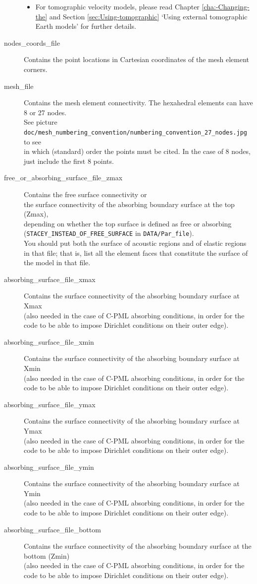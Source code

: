 \begin{description}
\begin{itemize}
\item For tomographic velocity models, please read Chapter \ref{cha:-Changing-the}
and Section \ref{sec:Using-tomographic} `Using external tomographic
Earth models' for further details.
\end{itemize}
\item [{nodes\_coords\_file}] Contains the point locations in Cartesian
coordinates of the mesh element corners.
\item [{mesh\_file}] Contains the mesh element connectivity. The hexahedral
elements can have 8 or 27 nodes.\\
 See picture \texttt{doc/mesh\_numbering\_convention/numbering\_convention\_27\_nodes.jpg}
to see\\
 in which (standard) order the points must be cited. In the case of
8 nodes, just include the first 8 points.
\item [{free\_or\_absorbing\_surface\_file\_zmax}] Contains the free surface
connectivity or \\
 the surface connectivity of the absorbing boundary surface at the
top (Zmax), \\
 depending on whether the top surface is defined as free or absorbing
(\texttt{STACEY\_INSTEAD\_OF\_FREE\_SURFACE} in \texttt{DATA/Par\_file}). \\
 You should put both the surface of acoustic regions and of elastic
regions in that file; that is, list all the element faces that constitute
the surface of the model in that file.
\item [{absorbing\_surface\_file\_xmax}] Contains the surface connectivity
of the absorbing boundary surface at Xmax \\
(also needed in the case of C-PML absorbing conditions, in order for
the code to be able to impose Dirichlet conditions on their outer
edge).
\item [{absorbing\_surface\_file\_xmin}] Contains the surface connectivity
of the absorbing boundary surface at Xmin \\
(also needed in the case of C-PML absorbing conditions, in order for
the code to be able to impose Dirichlet conditions on their outer
edge).
\item [{absorbing\_surface\_file\_ymax}] Contains the surface connectivity
of the absorbing boundary surface at Ymax \\
(also needed in the case of C-PML absorbing conditions, in order for
the code to be able to impose Dirichlet conditions on their outer
edge).
\item [{absorbing\_surface\_file\_ymin}] Contains the surface connectivity
of the absorbing boundary surface at Ymin \\
(also needed in the case of C-PML absorbing conditions, in order for
the code to be able to impose Dirichlet conditions on their outer
edge).
\item [{absorbing\_surface\_file\_bottom}] Contains the surface connectivity
of the absorbing boundary surface at the bottom (Zmin) \\
(also needed in the case of C-PML absorbing conditions, in order for
the code to be able to impose Dirichlet conditions on their outer
edge).
\end{description}
